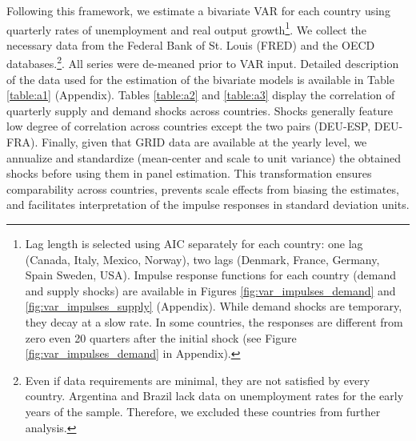 \documentclass[12pt, a4paper]{article}
\begin{document}
Following  this framework, we estimate a bivariate VAR for each country using quarterly rates of unemployment and real output growth\footnote{Lag length is selected using AIC separately for each country: one lag (Canada, Italy, Mexico, Norway), two lags (Denmark, France, Germany, Spain Sweden, USA). Impulse response functions for each country (demand and supply shocks) are available in Figures \ref{fig:var_impulses_demand} and \ref{fig:var_impulses_supply} (Appendix). While demand shocks are temporary, they decay at a slow rate. In some countries, the responses are different from zero even 20 quarters after the initial shock (see Figure \ref{fig:var_impulses_demand} in Appendix).}. We collect the necessary data from the Federal Bank of St. Louis (FRED) and the OECD databases.\footnote{Even if data requirements are minimal, they are not satisfied by every country. Argentina and Brazil lack data on unemployment rates for the early years of the sample. Therefore, we excluded these countries from further analysis.}. All series were de-meaned prior to VAR input. Detailed description of the data used for the estimation of the bivariate models is available in Table \ref{table:a1} (Appendix). Tables \ref{table:a2} and \ref{table:a3} display the correlation of quarterly supply and demand shocks across countries. Shocks generally feature low degree of correlation across countries except the two pairs (DEU-ESP, DEU-FRA). Finally, given that GRID data are available at the yearly level, we annualize and standardize (mean-center and scale to unit variance) the obtained shocks before using them in panel estimation. This transformation ensures comparability across countries, prevents scale effects from biasing the estimates, and facilitates interpretation of the impulse responses in standard deviation units.
\end{document}
